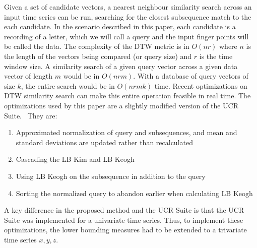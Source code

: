 Given a set of candidate vectors, a nearest neighbour similarity search across an input time series can be run, searching for the closest subsequence match to the each candidate. In the scenario described in this paper, each candidate is a recording of a letter, which we will call a query and the input finger points will be called the data.
The complexity of the DTW metric is in $O(nr)$ where $n$ is the length of the vectors being compared (or query size) and $r$ is the time window size. A similarity search of a given query vector across a given data vector of length $m$ would be in $O(nrm)$. With a database of query vectors of size $k$, the entire search would be in $O(nrmk)$ time.
Recent optimizations on DTW similarity search can make this entire operation feasible in real time. The optimizations used by this paper are a slightly modified version of the UCR Suite.~\cite{rakthanmanon2012searching}
 They are: 
\begin{enumerate}
\item
Approximated normalization of query and subsequences, and mean and standard deviations are updated rather than recalculated
\item
Cascading the LB Kim and LB Keogh
\item
Using LB Keogh on the subsequence in addition to the query
\item
Sorting the normalized query to abandon earlier when calculating LB Keogh
\end{enumerate}
A key difference in the proposed method and the UCR Suite is that the UCR Suite was implemented for a univariate time series. Thus, to implement these optimizations, the lower bounding measures had to be extended to a trivariate time series ${x,y,z}$.~\cite{rath2002lower-bounding}
